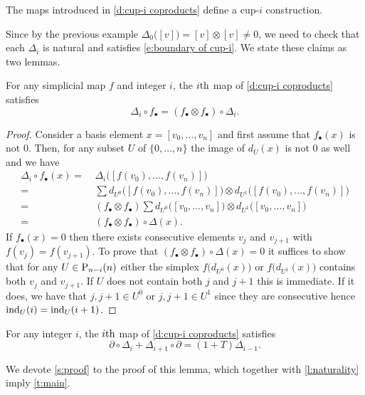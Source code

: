 \begin{theorem} \label{t:main}
	The maps introduced in \cref{d:cup-i coproducts} define a cup-$i$ construction.
\end{theorem}

Since by the previous example $\Delta_0\big([v]\big) = [v] \otimes [v] \neq 0$, we need to check that each $\Delta_i$ is natural and satisfies \eqref{e:boundary of cup-i}.
We state these claims as two lemmas.

\begin{lemma} \label{l:naturality}
	For any simplicial map $f$ and integer $i$, the $i\th$ map of \cref{d:cup-i coproducts} satisfies
	\begin{equation*}
	\Delta_i \circ f_\bullet = (f_\bullet \otimes f_\bullet) \circ \Delta_i.
	\end{equation*}
\end{lemma}

\begin{proof}
	Consider a basis element $x = [v_0, \dots, v_n]$ and first assume that $f_\bullet(x)$ is not $0$.
	Then, for any subset $U$ of $\{0, \dots, n\}$ the image of $d_U(x)$ is not $0$ as well and we have
	\begin{align*}
	\Delta_i \circ f_\bullet(x) =\ &
	\Delta_i \big([f(v_0), \dots, f(v_n)]\big) \\ =\ &
	\sum d_{U^0} \big([f(v_0), \dots, f(v_n)]\big) \otimes d_{U^1} \big([f(v_0), \dots, f(v_n)]\big) \\ =\ &
	(f_\bullet \otimes f_\bullet) \sum d_{U^0} \big([v_0, \dots, v_n]\big) \otimes d_{U^1} \big([v_0, \dots, v_n]\big) \\ =\ &
	(f_\bullet \otimes f_\bullet) \circ \Delta(x).
	\end{align*}
	If $f_\bullet(x) = 0$ then there exists consecutive elements $v_j$ and $v_{j+1}$ with $f(v_j) = f(v_{j+1})$.
	To prove that $(f_\bullet \otimes f_\bullet) \circ \Delta(x) = 0$ it suffices to show that for any $U \in \P_{n-i}(n)$ either the simplex $f \big(d_{U^0}(x) \big)$ or $f \big( d_{U^1}(x) \big)$ contains both $v_j$ and $v_{j+1}$.
	If $U$ does not contain both $j$ and $j+1$ this is immediate.
	If it does, we have that $j, j+1 \in U^0$ or $j, j+1 \in U^1$ since they are consecutive hence $\ind_U(i) = \ind_U(i+1)$.
\end{proof}

\begin{lemma} \label{l:main}
	For any integer $i$, the $i\th$ map of \cref{d:cup-i coproducts} satisfies
	\begin{equation*}
	\partial \circ \Delta_{i} + \Delta_{i+1} \circ \partial = (1+T) \Delta_{i-1}.
	\end{equation*}
\end{lemma}

We devote \cref{s:proof} to the proof of this lemma, which together with \cref{l:naturality} imply \cref{t:main}.
